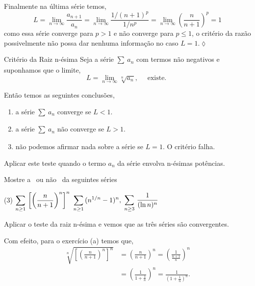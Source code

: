Finalmente na \'{u}ltima s\'{e}rie temos,
\begin{equation*}
  L=\lim_{n\to\infty}\frac{a_{n+1}}{a_n}=\lim_{n\to\infty}\frac{1/(n+1)^p}{1/n^p}
  =\lim_{n\to\infty}\left(\frac{n}{n+1}\right)^p=1
\end{equation*}
como essa s\'{e}rie converge para $p>1$ e n\~{a}o converge para $p\leq 1$,
o crit\'{e}rio da raz\~{a}o possivelmente n\~{a}o possa dar nenhuma informa\c{c}\~{a}o
no caso $L=1$.\hfill \(\lozenge\)

\begin{theoc}{Crit\'{e}rio da Raiz n-\'{e}sima}{}
  Seja a s\'{e}rie $\sum_{}\,a_{n}$ com termos n\~{a}o negativos
e suponhamos que o limite,
\begin{equation*}
  L=\lim_{n\to\infty}\sqrt[n]{a_n},\quad \text{ existe. }
\end{equation*}

Ent\~{a}o temos as seguintes conclus\~{o}es,
\begin{enumerate}[label=\rm{(\alph*)},leftmargin=4em,ref=\rm{(\alph*)}]
  \item a s\'{e}rie $\sum_{}\,a_{n}$ converge se $L<1$.
  \item a s\'{e}rie $\sum_{}\,a_{n}$ n\~{a}o converge se $L>1$.
  \item n\~{a}o podemos afirmar nada sobre a s\'{e}rie se $L=1$. O critério falha.
\end{enumerate}
\end{theoc}

\begin{obs}
Aplicar este teste quando o termo $a_n$ da s\'{e}rie envolva n-\'{e}simas
pot\^{e}ncias.
\end{obs}

\begin{exer}
Mostre a \conver\ ou n\~{a}o \conver\ da seguintes s\'{e}ries
\begin{tasks}[label=(\alph*),item-indent=3em,label-width=4ex,ref=(\alph*)](3)
\task \(\displaystyle \sum_{n\geq1}\,\left[\left(\frac{n}{n+1}\right)^n\right]^{n}\)
\task \(\displaystyle \sum_{n\geq1}\,(n^{1/n}-1)^{n},\)
\task \(\displaystyle \sum_{n\geq 3 }\, \frac{1}{(\ln n)^{n}}\)
\end{tasks}
\end{exer}

\solo Aplicar o teste da raiz n-\'{e}sima e vemos que as tr\^{e}s s\'{e}ries
s\~{a}o convergentes.

 Com efeito, para o exercício (a) temos que,
 \begin{align*}
\sqrt[n]{\left[
\left(\frac{n}{n+1}\right)^n\right]^n}&=
\left(\frac{n}{n+1}\right)^n=\left(\frac{1}{\frac{n+1}{n}}\right)^n\\[2ex]
&=\left(\frac{1}{1+\frac{1}{n}}\right)^n=\frac{1}{\left(1+\frac{1}{n}\right)^n}.
\end{align*}


